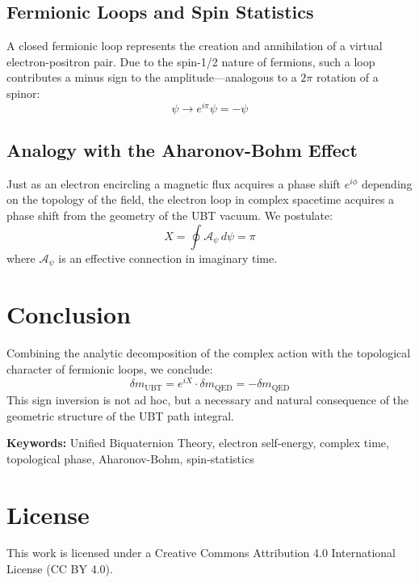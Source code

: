 \documentclass[12pt, a4paper]{article}
\begin{document}
\subsection{Fermionic Loops and Spin Statistics}

A closed fermionic loop represents the creation and annihilation of a virtual electron-positron pair. Due to the spin-1/2 nature of fermions, such a loop contributes a minus sign to the amplitude—analogous to a \( 2\pi \) rotation of a spinor:
\[
\psi \rightarrow e^{i\pi} \psi = -\psi
\]

\subsection{Analogy with the Aharonov-Bohm Effect}

Just as an electron encircling a magnetic flux acquires a phase shift \( e^{i\phi} \) depending on the topology of the field, the electron loop in complex spacetime acquires a phase shift from the geometry of the UBT vacuum. We postulate:
\[
X = \oint \mathcal{A}_{\psi} \, d\psi = \pi
\]
where \( \mathcal{A}_{\psi} \) is an effective connection in imaginary time.

\section{Conclusion}

Combining the analytic decomposition of the complex action with the topological character of fermionic loops, we conclude:
\[
\delta m_{\text{UBT}} = e^{iX} \cdot \delta m_{\text{QED}} = -\delta m_{\text{QED}}
\]
This sign inversion is not ad hoc, but a necessary and natural consequence of the geometric structure of the UBT path integral.

\bigskip
\noindent\textbf{Keywords:} Unified Biquaternion Theory, electron self-energy, complex time, topological phase, Aharonov-Bohm, spin-statistics


\section*{License}
This work is licensed under a Creative Commons Attribution 4.0 International License (CC BY 4.0).
\end{document}
